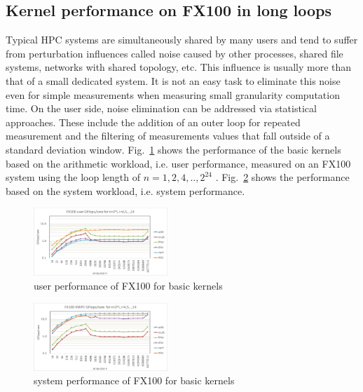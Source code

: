 \documentclass[conference]{IEEEtran}
\begin{document}
\subsection{Kernel performance on FX100 in long loops}
\label{subsection:long-kernels-fx100}
%
%
%
%
Typical HPC systems are simultaneously shared by many users and tend to
suffer from perturbation influences called noise caused by other processes,
shared file systems, networks with shared topology, etc.
This influence is usually more than that of a small dedicated system.
It is not an easy task to eliminate this noise even for simple measurements 
when measuring small granularity computation time.
On the user side, noise elimination can be addressed via statistical
approaches. These include the addition of an outer loop for repeated
measurement and the filtering of measurements values that fall outside of
a standard deviation window.
\fi
%
%
Fig.~\ref{fig:fx100-gflops-user-long-R8} shows the 
performance of the basic kernels based on the arithmetic workload,
i.e. user performance,
measured on an FX100 system using the loop length of
\begin{math}
n=1,2,4,..,2^{24}
\end{math}
.
Fig.~\ref{fig:fx100-gflops-system-long-R8} shows the 
performance based on the system workload, i.e. system performance.

\begin{figure}[tb]
\centering
\includegraphics[width=0.45\textwidth]{figs/fx100-gflops-user-long-R8.pdf}
\caption{user performance of FX100 for basic kernels}
\label{fig:fx100-gflops-user-long-R8}
\end{figure}

\begin{figure}[tb]
\centering
\includegraphics[width=0.45\textwidth]{figs/fx100-gflops-system-long-R8.pdf}
\caption{system performance of FX100 for basic kernels}
\label{fig:fx100-gflops-system-long-R8}
\end{figure}
\end{document}
